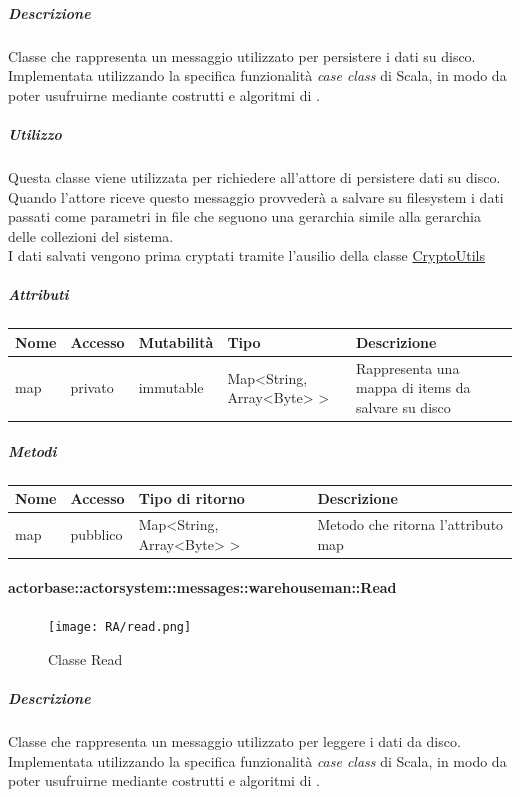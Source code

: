 \documentclass{scalatekids-article}
\begin{document}
\subparagraph{Descrizione}
Classe che rappresenta un messaggio utilizzato per persistere i dati su disco.\\Implementata utilizzando la specifica funzionalità \textit{case class} di Scala,
in modo da poter usufruirne mediante costrutti e algoritmi di
.

\subparagraph{Utilizzo}
Questa classe viene utilizzata per richiedere all'attore di persistere dati
su disco. Quando l'attore riceve questo messaggio provvederà a salvare su
filesystem i dati passati come parametri in file che seguono una gerarchia
simile alla gerarchia delle collezioni del sistema.\\I dati salvati vengono prima cryptati tramite l'ausilio della classe \hyperref[sec:actorbase::actorsystem::utils::CryptoUtils]{CryptoUtils}

\subparagraph{Attributi}
\begin{tabular}{| p{2cm} | p{1.5cm} | p{2cm} | p{3cm} | p{8.5cm} |}
  \hline
  Nome & Accesso & Mutabilità & Tipo & Descrizione\\
  \hline
  map & privato & immutable & Map<String, Array<Byte> > & Rappresenta una mappa di items da salvare su disco\\
  \hline
\end{tabular}

\subparagraph{Metodi}
\begin{tabular}{| l | l | l | l |}
  \hline
  Nome & Accesso & Tipo di ritorno & Descrizione\\
  \hline
  map & pubblico & Map<String, Array<Byte> > & Metodo che ritorna l'attributo map\\
  \hline
\end{tabular}

\paragraph{actorbase::actorsystem::messages::warehouseman::Read}
\label{sec:actorbase::actorsystem::messages::warehouseman::Read}

\begin{figure}[H]
  \begin{center}
    \texttt{[image: RA/read.png]}
    \caption{Classe Read}
  \end{center}
\end{figure}

\subparagraph{Descrizione}
Classe che rappresenta un messaggio utilizzato per leggere i dati da disco.\\Implementata utilizzando la specifica funzionalità \textit{case class} di Scala,
in modo da poter usufruirne mediante costrutti e algoritmi di
.
\end{document}
